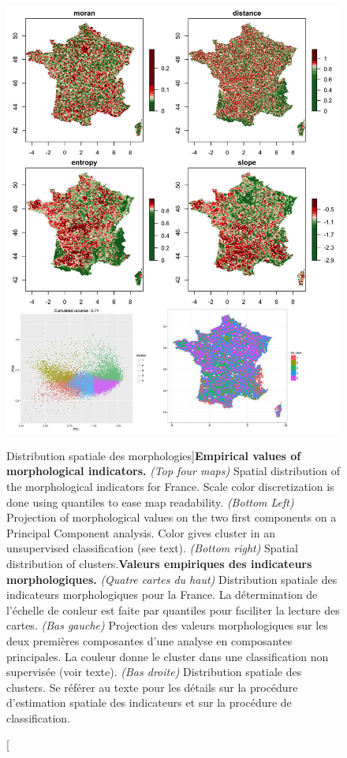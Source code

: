 \begin{figure}
\includegraphics[width=0.9\linewidth]{Figures/Final/4-1-1-fig-staticcorrelations-empirical}
\caption[Empirical values of morphological indicators][Distribution spatiale des morphologies]{\textbf{Empirical values of morphological indicators.} \textit{(Top four maps)} Spatial distribution of the morphological indicators for France. Scale color discretization is done using quantiles to ease map readability. \textit{(Bottom Left)} Projection of morphological values on the two first components on a Principal Component analysis. Color gives cluster in an unsupervised classification (see text). \textit{(Bottom right)} Spatial distribution of clusters.\label{fig:staticcorrelations:empirical}}{\textbf{Valeurs empiriques des indicateurs morphologiques.} \textit{(Quatre cartes du haut)} Distribution spatiale des indicateurs morphologiques pour la France. La détermination de l'échelle de couleur est faite par quantiles pour faciliter la lecture des cartes. \textit{(Bas gauche)} Projection des valeurs morphologiques sur les deux premières composantes d'une analyse en composantes principales. La couleur donne le cluster dans une classification non supervisée (voir texte). \textit{(Bas droite)} Distribution spatiale des clusters. Se référer au texte pour les détails sur la procédure d'estimation spatiale des indicateurs et sur la procédure de classification.\label{fig:staticcorrelations:empirical}}
\end{figure}

